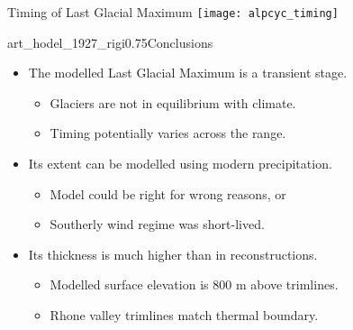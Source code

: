     \begin{frame}{Timing of Last Glacial Maximum}
      \texttt{[image: alpcyc\_timing]}
    \end{frame}

    \begin{sectionframe}{art_hodel_1927_rigi}{0.75}{Conclusions}
      \begin{itemize}
        \item The modelled \alert{Last Glacial Maximum} is a transient stage.
          \begin{itemize}
            \item Glaciers are not in equilibrium with climate.
            \item Timing potentially varies across the range.
          \end{itemize}
        \pause
        \item Its extent can be modelled using \alert{modern precipitation}.
          \begin{itemize}
            \item Model could be right for wrong reasons, or
            \item Southerly wind regime was short-lived.
          \end{itemize}
        \pause
        \item Its thickness is \alert{much higher} than in reconstructions.
          \begin{itemize}
            \item Modelled surface elevation is 800 m above trimlines.
            \item Rhone valley trimlines match thermal boundary.
          \end{itemize}
      \end{itemize}
    \end{sectionframe}

